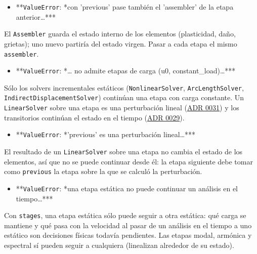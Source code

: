 \documentclass[11pt,oneside]{report}
\begin{document}
\begin{itemize}
  \item **\texttt{ValueError}: *con 'previous' pase también el 'assembler' de la etapa anterior\ldots{}***
\end{itemize}
  El \texttt{Assembler} guarda el estado interno de los elementos (plasticidad, daño, grietas); uno nuevo partiría del estado virgen. Pasar a cada etapa el mismo \texttt{assembler}.

\begin{itemize}
  \item **\texttt{ValueError}: *\ldots{} no admite etapas de carga (u0, constant\_load)\ldots{}***
\end{itemize}
  Sólo los solvers incrementales estáticos (\texttt{NonlinearSolver}, \texttt{ArcLengthSolver}, \texttt{IndirectDisplacementSolver}) continúan una etapa con carga constante. Un \texttt{LinearSolver} sobre una etapa es una perturbación lineal (\href{https://github.com/jretamav/solidum-fem/blob/main/docs/adr/0031-analisis-lineales-sobre-el-estado-de-una-etapa.md}{ADR 0031}) y los transitorios continúan el estado en el tiempo (\href{https://github.com/jretamav/solidum-fem/blob/main/docs/adr/0029-continuidad-de-los-analisis-en-el-tiempo.md}{ADR 0029}).

\begin{itemize}
  \item **\texttt{ValueError}: *'previous' es una perturbación lineal\ldots{}***
\end{itemize}
  El resultado de un \texttt{LinearSolver} sobre una etapa no cambia el estado de los elementos, así que no se puede continuar desde él: la etapa siguiente debe tomar como \texttt{previous} la etapa sobre la que se calculó la perturbación.

\begin{itemize}
  \item **\texttt{ValueError}: *una etapa estática no puede continuar un análisis en el tiempo\ldots{}***
\end{itemize}
  Con \texttt{stages}, una etapa estática sólo puede seguir a otra estática: qué carga se mantiene y qué pasa con la velocidad al pasar de un análisis en el tiempo a uno estático son decisiones físicas todavía pendientes. Las etapas modal, armónica y espectral sí pueden seguir a cualquiera (linealizan alrededor de su estado).
\end{document}

